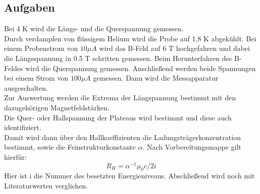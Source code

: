 \subsection{Aufgaben}
Bei 4 K wird die Längs- und die Querspannung gemessen. \\
Durch verdampfen von flüssigem Helium wird die Probe auf 1,8 K abgekühlt. Bei einem Probenstrom von $10 \mu A$ wird das B-Feld auf 6 T hochgefahren und dabei die Längsspannung in 0.5 T schritten gemessen. Beim Herunterfahren des B-Feldes wird die Querspannung gemessen. Anschließend werden beide Spannungen bei einem Strom von $100 \mu A$ gemessen. Dann wird die Messapparatur ausgeschalten. \\

Zur Auswertung werden die Extrema der Längspannung bestimmt mit den dazugehörigen Magnetfeldstärken. \\
Die Quer- oder Hallspannung der Plateaus wird bestimmt und diese auch identifiziert. \\
Damit wird dann über den Hallkoeffizienten die Ladungsträgerkonzentration bestimmt, sowie die Feinstrukturkonstante $\alpha$. Nach Vorbereitungsmappe gilt hierfür:
$$R_H = \alpha ^{-1} \mu _0 c /2i $$
Hier ist i die Nummer des besetzten Energieniveaus. Abschließend wird noch mit Literaturwerten verglichen.